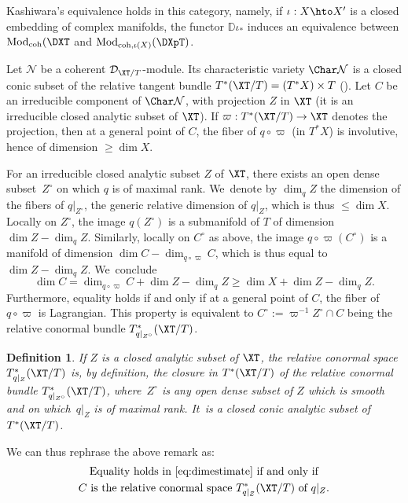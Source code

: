 \documentclass{amsart}
\theoremstyle{plain}
\numberwithin{theorem}{section}
\newtheorem{definition}[theorem]{Definition}
\theoremstyle{definition}
\theoremstyle{remark}
\theoremstyle{definition}
\newcommand{\D}{\mathbb{D}}
\newcommand{\cD}{\mathcal{D}}
\newcommand{\cN}{\mathcal{N}}
\newcommand{\Mod}{\textup{Mod}}
\newcommand{\coh}{\textup{coh}}
\begin{document}
Kashiwara's equivalence holds in this category, namely, if $\iota:X\hto X'$ is a closed embedding of complex manifolds, the functor $\D\iota_*$ induces an equivalence between $\Mod_\coh(\DXT$ and $\Mod_{\coh,\iota(X)}(\DXpT)$.

Let $\cN$ be a coherent $\cD_{\XT/T}$-module. Its characteristic variety $\Char\cN$ is a closed conic subset of the relative tangent bundle $T^*(\XT/T)=(T^*X)\times T$ (\cf\cite[\S III.1.3]{Schpbook}). Let $C$ be an irreducible component of $\Char\cN$, with projection $Z$ in $\XT$ (it is an irreducible closed analytic subset of $\XT$). If $\varpi:T^*(\XT/T)\to \XT$ denotes the projection, then at a general point of $C$, the fiber of $q\circ\varpi$ (in $T^*X$) is involutive, hence of dimension $\geq\dim X$.

For an irreducible closed analytic subset $Z$ of $\XT$, there exists an open dense subset~$Z^\circ$ on which $q$ is of maximal rank. We~denote by $\dim_qZ$ the dimension of the fibers of $q|_{Z^\circ}$, \ie the generic relative dimension of $q|_Z$, which is thus $\leq\dim X$. Locally on $Z^\circ$, the image $q(Z^\circ)$ is a submanifold of $T$ of dimension $\dim Z-\dim_qZ$. Similarly, locally on $C^\circ$ as above, the image $q\circ\varpi(C^\circ)$ is a manifold of dimension $\dim C-\dim_{q\circ\varpi}C$, which is thus equal to $\dim Z-\dim_qZ$. We~conclude
\begin{equation}\label{eq:dimestimate}
\dim C=\dim_{q\circ\varpi}C+\dim Z-\dim_qZ\geq\dim X+\dim Z-\dim_qZ.
\end{equation}
Furthermore, equality holds if and only if at a general point of $C$, the fiber of $q\circ\varpi$ is Lagrangian. This property is equivalent to $C^\circ:=\varpi^{-1}Z^\circ\cap C$ being the relative conormal bundle $T^*_{q|_{Z^\circ}}(\XT/T)$.

\begin{definition}\label{def:relconormal}
If $Z$ is a closed analytic subset of $\XT$, the \emph{relative conormal space} $T^*_{q|_Z}(\XT/T)$ is, by definition, the closure in $T^*(\XT/T)$ of the relative conormal bundle $T^*_{q|_{Z^\circ}}(\XT/T)$, where~$Z^\circ$ is any open dense subset of $Z$ which is smooth and on which~$q|_Z$ is of maximal rank. It~is a closed conic analytic subset of $T^*(\XT/T)$.
\end{definition}

We can thus rephrase the above remark as:
\begin{equation}\label{eq:relconormal}
\begin{gathered}
\text{Equality holds in \eqref{eq:dimestimate} if and only if}\\
\text{$C$ is the relative conormal space $T^*_{q|_{Z}}(\XT/T)$ of $q|_Z$.}
\end{gathered}
\end{equation}
\end{document}
